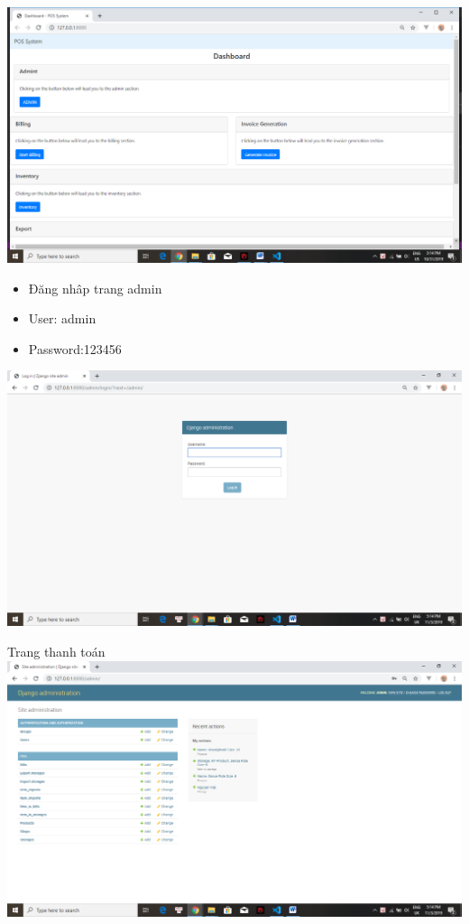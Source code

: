 \documentclass{article}
\begin{document}
\includegraphics[scale = 0.4]{15.png}

\pagebreak
\begin{itemize}
    \item Đăng nhâp trang admin
    \item User: admin
    \item Password:123456
\end{itemize}




\includegraphics[scale = 0.4]{21.png}

Trang thanh toán\\

\includegraphics[scale = 0.4]{22.png}
\end{document}
